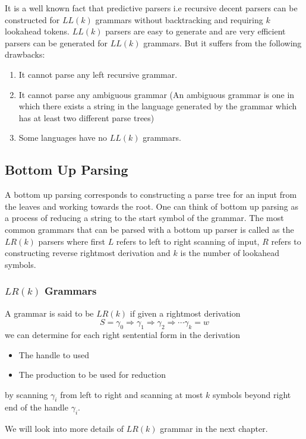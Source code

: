 \documentclass[•]{book}
\begin{document}
 It is a well known fact that predictive parsers i.e recursive decent parsers can be constructed for $LL(k)$ grammars without backtracking and requiring $k$ lookahead tokens. $LL(k)$ parsers are easy to generate and are very efficient parsers can be generated for $LL(k)$ grammars. But it suffers from the following drawbacks:
 
 \begin{enumerate}
 \item It cannot parse any left recursive grammar.
 \item It cannot parse any ambiguous grammar (An ambiguous grammar is one in which there exists a string in the language generated by the grammar which has at least two different parse trees)
 \item Some languages have no $LL(k)$ grammars.
 
 \end{enumerate}
 
 \subsection{Bottom Up Parsing}
 A bottom up parsing corresponds to constructing a parse tree for an input from the leaves and working towards the root. One can think of bottom up parsing as a process of reducing a string to the start symbol of the grammar. The most common grammars that can be parsed with a bottom up parser is called as the $LR(k)$ parsers where first $L$ refers to left to right scanning of input, $R$ refers to constructing reverse rightmost derivation and $k$ is the number of lookahead symbols.
 
\subsubsection*{$LR(k)$ Grammars} 

A grammar is said to be $LR(k)$ if given a rightmost derivation 
$$
S = \gamma_0 \Rightarrow \gamma_1 \Rightarrow \gamma_2 \Rightarrow \cdots \gamma_k = w
$$
we can determine for each right sentential form in the derivation
\begin{itemize}
\item The handle to used 
\item The production to be used for reduction  
\end{itemize}
by scanning $\gamma_i$ from left to right and scanning at most $k$ symbols beyond right end of the handle $\gamma_i$.

We will look into more details of $LR(k)$ grammar in the next chapter.
\end{document}
